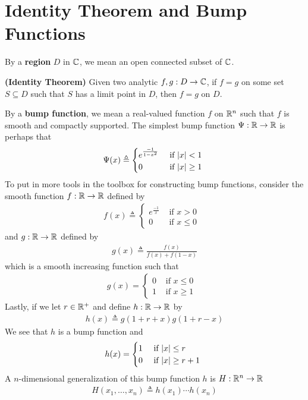 \documentclass{report}
\begin{document}
\section{Identity Theorem and Bump Functions}
\begin{mdframed}
By a \textbf{region} $D$ in $\mathbb{C}$, we mean an open connected subset of  $\mathbb{C}$. 
\end{mdframed}
\begin{theorem}
\textbf{(Identity Theorem)} Given two analytic $f,g:D\rightarrow \mathbb{C}$, if $f=g$ on some set  $S \subseteq D$ such that $S$ has a limit point in $D$, then  $f=g$ on  $D$.
\end{theorem}
\begin{mdframed}
By a \textbf{bump function}, we mean a real-valued function $f$  on $\mathbb{R}^n$ such that  $f$ is smooth and compactly supported. The simplest bump function $\Psi:\mathbb{R}\rightarrow \mathbb{R}$ is perhaps that 
\begin{align*}
\Psi (x)\triangleq \begin{cases}
  e^{\frac{-1}{1-x^2}}& \text{ if $\left|x\right|<1$ }\\
  0& \text{ if $\left|x\right|\geq 1$ }
\end{cases}
\end{align*}
To put in more tools in the toolbox for constructing bump functions, consider the smooth function $f:\mathbb{R}\rightarrow \mathbb{R}$ defined by 
\begin{align*}
f(x)\triangleq \begin{cases}
  e^{\frac{-1}{x}}& \text{ if $x>0$ }\\
  0& \text{ if $x\leq 0$ }
\end{cases}
\end{align*}
and  $g:\mathbb{R}\rightarrow \mathbb{R}$ defined by 
\begin{align*}
g(x)\triangleq \frac{f(x)}{f(x)+f(1-x)}
\end{align*}
which is a smooth increasing function such that  
\begin{align*}
g(x)=\begin{cases}
  0& \text{ if $x\leq 0$ }\\
  1& \text{ if $x\geq 1$ }
\end{cases}
\end{align*}
Lastly, if we let $r\in\mathbb{R}^+$ and define $h:\mathbb{R}\rightarrow \mathbb{R}$ by
\begin{align*}
h(x)\triangleq g(1+r+x)g(1+r-x)
\end{align*}
We see that $h$ is a bump function and 
\begin{align*}
h(x)=\begin{cases}
  1& \text{ if $\left|x\right|\leq r$ }\\
  0& \text{ if $\left|x\right|\geq r+1$ }
\end{cases}
\end{align*}
A $n$-dimensional generalization of this bump function $h$ is  $H:\mathbb{R}^n\rightarrow \mathbb{R}$ 
\begin{align*}
H(x_1,\dots ,x_n)\triangleq  h(x_1)\cdots h(x_n)
\end{align*}
\end{mdframed}
\end{document}
